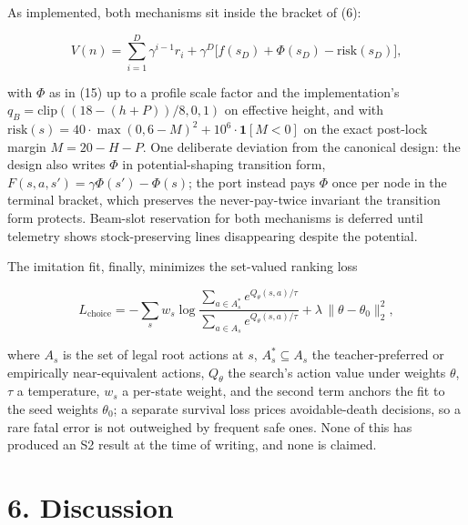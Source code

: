 \documentclass[
  11pt,
]{article}
\newcounter{none} %
\begin{document}
As implemented, both mechanisms sit inside the bracket of (6):

\begin{equation}V(n) = \sum_{i=1}^{D} \gamma^{i-1} r_i + \gamma^D \big[ f(s_D) + \Phi(s_D) - \mathrm{risk}(s_D) \big],
\end{equation}

with \(\Phi\) as in (15) up to a profile scale factor and the
implementation's \(q_B = \mathrm{clip}((18 - (h + P))/8, 0, 1)\) on
effective height, and with
\(\mathrm{risk}(s) = 40 \cdot \max(0, 6 - M)^2 + 10^6 \cdot
\mathbf{1}[M < 0]\) on the exact post-lock margin \(M = 20 - H - P\).
One deliberate deviation from the canonical design: the design also
writes \(\Phi\) in potential-shaping transition form,
\(F(s, a, s') = \gamma \Phi(s')
- \Phi(s)\); the port instead pays \(\Phi\) once per node in the
terminal bracket, which preserves the never-pay-twice invariant the
transition form protects. Beam-slot reservation for both mechanisms is
deferred until telemetry shows stock-preserving lines disappearing
despite the potential.

The imitation fit, finally, minimizes the set-valued ranking loss

\begin{equation}L_{\mathrm{choice}} = -\sum_s w_s \log \frac{\sum_{a \in A^*_s} e^{Q_\theta(s, a) / \tau}}{\sum_{a \in A_s} e^{Q_\theta(s, a) / \tau}} + \lambda \, \| \theta - \theta_0 \|_2^2,
\end{equation}

where \(A_s\) is the set of legal root actions at \(s\),
\(A^*_s \subseteq A_s\) the teacher-preferred or empirically
near-equivalent actions, \(Q_\theta\) the search's action value under
weights \(\theta\), \(\tau\) a temperature, \(w_s\) a per-state weight,
and the second term anchors the fit to the seed weights \(\theta_0\); a
separate survival loss prices avoidable-death decisions, so a rare fatal
error is not outweighed by frequent safe ones. None of this has produced
an S2 result at the time of writing, and none is claimed.

\section{6. Discussion}\label{discussion}
\end{document}

